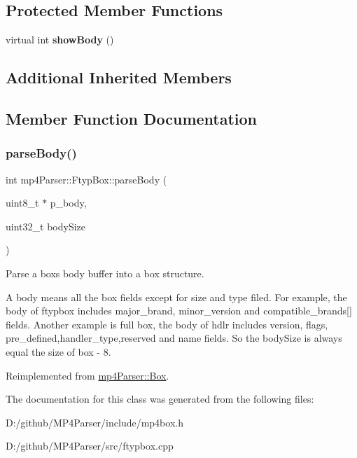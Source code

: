 \subsection*{Protected Member Functions}
\begin{DoxyCompactItemize}
\item 
\mbox{\label{classmp4_parser_1_1_ftyp_box_a021b9cfb7b099de84df253ca057c8e72}} 
virtual int {\bfseries show\+Body} ()
\end{DoxyCompactItemize}
\subsection*{Additional Inherited Members}


\subsection{Member Function Documentation}
\mbox{\label{classmp4_parser_1_1_ftyp_box_a89b1fd7a787bbe00967ab4a34972303b}} 
\subsubsection{\texorpdfstring{parseBody()}{parseBody()}}
{\footnotesize\ttfamily int mp4\+Parser\+::\+Ftyp\+Box\+::parse\+Body (\begin{DoxyParamCaption}\item[{uint8\+\_\+t $\ast$}]{p\+\_\+body,  }\item[{uint32\+\_\+t}]{body\+Size }\end{DoxyParamCaption})\hspace{0.3cm}{\ttfamily [virtual]}}



Parse a box\textquotesingle{}s body buffer into a box structure. 

A body means all the box fields except for size and type filed. For example, the body of ftypbox includes major\+\_\+brand, minor\+\_\+version and compatible\+\_\+brands\mbox{[}\mbox{]} fields. Another example is full box, the body of hdlr includes version, flags, pre\+\_\+defined,handler\+\_\+type,reserved and name fields. So the body\+Size is always equal the size of box -\/ 8. 

Reimplemented from \mbox{\hyperlink{classmp4_parser_1_1_box_a3dd0c084ac65bc77b69ac5ecaf796cb2}{mp4\+Parser\+::\+Box}}.



The documentation for this class was generated from the following files\+:\begin{DoxyCompactItemize}
\item 
D\+:/github/\+M\+P4\+Parser/include/mp4box.\+h\item 
D\+:/github/\+M\+P4\+Parser/src/ftypbox.\+cpp\end{DoxyCompactItemize}
